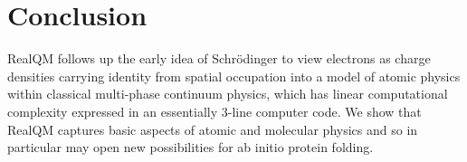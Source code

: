 \documentclass[11pt]{article} %
\begin{document}
\section{Conclusion}
RealQM follows up the early idea of Schr\"odinger to view electrons as charge densities carrying identity from spatial occupation into a model of atomic physics within classical multi-phase continuum physics,  which has linear computational complexity expressed in an essentially 3-line computer code.  We show that RealQM captures basic aspects of atomic and molecular physics and so in particular may open new possibilities for ab initio protein folding. 





  
\end{document}
